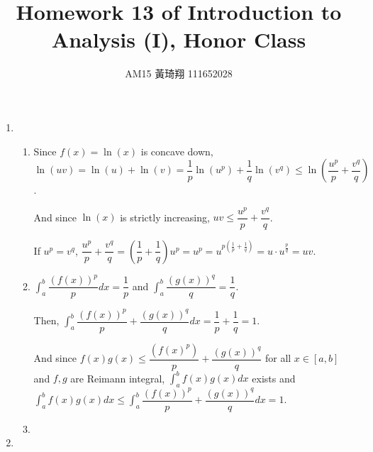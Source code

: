 \documentclass[12pt]{article}
\title{Homework 13 of Introduction to Analysis (I), Honor Class}
\author{AM15 黃琦翔 111652028}
\begin{document}
\maketitle
\begin{enumerate}
    \item \begin{enumerate}
        \item Since $f(x) = \ln(x)$ is concave down, $\ln(uv) = \ln(u) + \ln(v) = \dfrac{1}{p}\ln(u^p) + \dfrac{1}{q}\ln(v^q) \leq \ln(\dfrac{u^p}{p} + \dfrac{v^q}{q})$.
        
        And since $\ln(x)$ is strictly increasing, $uv \leq \dfrac{u^p}{p} + \dfrac{v^q}{q}$.

        If $u^p = v^q$, $\dfrac{u^p}{p} + \dfrac{v^q}{q} = (\dfrac{1}{p} + \dfrac{1}{q}) u^p = u^p = u^{p(\frac{1}{p} + \frac{1}{q})} = u\cdot u^{\frac{p}{q}} = uv$.

        \item $\displaystyle\int_a^b \dfrac{(f(x))^p}{p} dx= \dfrac{1}{p}$ and $\displaystyle\int_a^b \dfrac{(g(x))^q}{q} = \dfrac{1}{q}$.
        
        Then, $\displaystyle\int_a^b \dfrac{(f(x))^p}{p} + \dfrac{(g(x))^q}{q} dx = \dfrac{1}{p} + \dfrac{1}{q} = 1$.

        And since $f(x)g(x) \leq \dfrac{(f(x)^p)}{p} + \dfrac{(g(x))^q}{q}$ for all $x\in [a, b]$ and $f, g$ are Reimann integral,
        $\displaystyle\int_a^b f(x)g(x) dx$ exists and $\displaystyle\int_a^b f(x) g(x) dx \leq \displaystyle\int_a^b \dfrac{(f(x))^p}{p} + \dfrac{(g(x))^q}{q} dx = 1$.

        \item 
    \end{enumerate}

    \item 
\end{enumerate}
\end{document}
